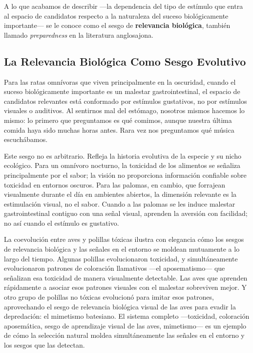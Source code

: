 \documentclass[
  letterpaper,
  DIV=11,
  numbers=noendperiod]{scrreprt}
\begin{document}
\begin{tcolorbox}[enhanced jigsaw, arc=.35mm, bottomrule=.15mm, breakable, colback=white, colframe=quarto-callout-note-color-frame, left=2mm, leftrule=.75mm, opacityback=0, rightrule=.15mm, toprule=.15mm]
A lo que acabamos de describir ---la dependencia del tipo de estímulo
que entra al espacio de candidatos respecto a la naturaleza del suceso
biológicamente importante--- se le conoce como el sesgo de
\textbf{relevancia biológica}, también llamado \emph{preparedness} en la
literatura anglosajona.

\subsection{La Relevancia Biológica Como Sesgo
Evolutivo}\label{la-relevancia-bioluxf3gica-como-sesgo-evolutivo}

Para las ratas omnívoras que viven principalmente en la oscuridad,
cuando el suceso biológicamente importante es un malestar
gastrointestinal, el espacio de candidatos relevantes está conformado
por estímulos gustativos, no por estímulos visuales o auditivos. Al
sentirnos mal del estómago, nosotros mismos hacemos lo mismo: lo primero
que preguntamos es qué comimos, aunque nuestra última comida haya sido
muchas horas antes. Rara vez nos preguntamos qué música escuchábamos.

Este sesgo no es arbitrario. Refleja la historia evolutiva de la especie
y su nicho ecológico. Para un omnívoro nocturno, la toxicidad de los
alimentos se señaliza principalmente por el sabor; la visión no
proporciona información confiable sobre toxicidad en entornos oscuros.
Para las palomas, en cambio, que forrajean visualmente durante el día en
ambientes abiertos, la dimensión relevante es la estimulación visual, no
el sabor. Cuando a las palomas se les induce malestar gastrointestinal
contiguo con una señal visual, aprenden la aversión con facilidad; no
así cuando el estímulo es gustativo.

La coevolución entre aves y polillas tóxicas ilustra con elegancia cómo
los sesgos de relevancia biológica y las señales en el entorno se
moldean mutuamente a lo largo del tiempo. Algunas polillas evolucionaron
toxicidad, y simultáneamente evolucionaron patrones de coloración
llamativos ---el aposematismo--- que señalizan esa toxicidad de manera
visualmente detectable. Las aves que aprenden rápidamente a asociar esos
patrones visuales con el malestar sobreviven mejor. Y otro grupo de
polillas no tóxicas evolucionó para imitar esos patrones, aprovechando
el sesgo de relevancia biológica visual de las aves para evadir la
depredación: el mimetismo batesiano. El sistema completo ---toxicidad,
coloración aposemática, sesgo de aprendizaje visual de las aves,
mimetismo--- es un ejemplo de cómo la selección natural moldea
simultáneamente las señales en el entorno y los sesgos que las detectan.


\end{tcolorbox}
\end{document}
